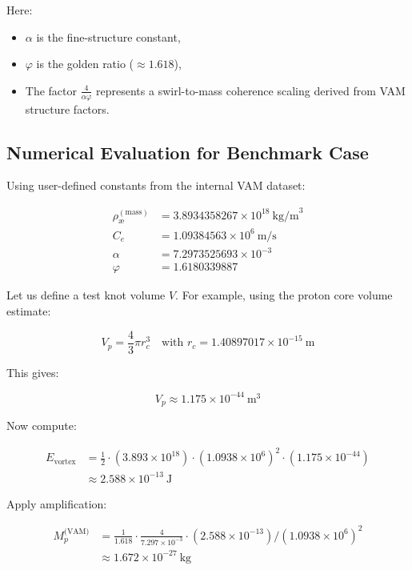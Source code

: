 Here:
\begin{itemize}
\item \( \alpha \) is the fine-structure constant,
\item \( \varphi \) is the golden ratio (\( \approx 1.618 \)),
\item The factor \( \frac{4}{\alpha \varphi} \) represents a swirl-to-mass coherence scaling derived from VAM structure factors.
\end{itemize}

\subsection{Numerical Evaluation for Benchmark Case}

Using user-defined constants from the internal VAM dataset:

\begin{align*}
\rho_\text{\ae}^{(\text{mass})} &= 3.8934358267 \times 10^{18} \ \text{kg/m}^3 \\
C_e &= 1.09384563 \times 10^6 \ \text{m/s} \\
\alpha &= 7.2973525693 \times 10^{-3} \\
\varphi &= 1.6180339887
\end{align*}

Let us define a test knot volume \( V \). For example, using the proton core volume estimate:

\[
V_p = \frac{4}{3} \pi r_c^3 \quad \text{with } r_c = 1.40897017 \times 10^{-15} \ \text{m}
\]

This gives:

\[
V_p \approx 1.175 \times 10^{-44} \ \text{m}^3
\]

Now compute:

\begin{align*}
E_{\text{vortex}} &= \frac{1}{2} \cdot (3.893 \times 10^{18}) \cdot (1.0938 \times 10^6)^2 \cdot (1.175 \times 10^{-44}) \\
&\approx 2.588 \times 10^{-13} \ \text{J}
\end{align*}

Apply amplification:

\begin{align*}
M_p^{\text{(VAM)}} &= \frac{1}{1.618} \cdot \frac{4}{7.297 \times 10^{-3}} \cdot \left( 2.588 \times 10^{-13} \right) / (1.0938 \times 10^6)^2 \\
&\approx 1.672 \times 10^{-27} \ \text{kg}
\end{align*}

